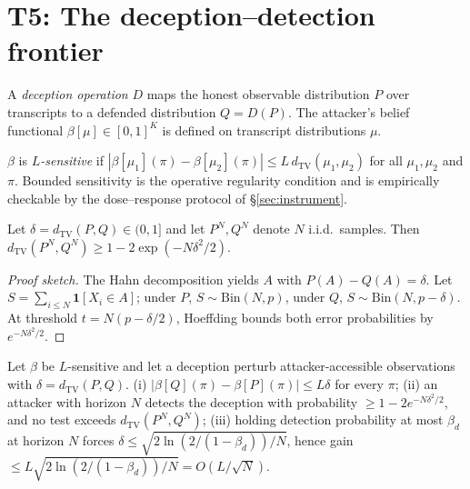 \documentclass[acmsmall,review,anonymous]{acmart}
\newcommand{\TV}{d_{\mathrm{TV}}}
\begin{document}
\section{T5: The deception--detection frontier}\label{sec:t5}

A \emph{deception operation} $D$ maps the honest observable distribution $P$
over transcripts to a defended distribution $Q=D(P)$. The attacker's belief
functional $\beta[\mu]\in[0,1]^K$ is defined on transcript distributions $\mu$.

\begin{definition}[Sensitivity]
$\beta$ is \emph{$L$-sensitive} if
$|\beta[\mu_1](\pi)-\beta[\mu_2](\pi)|\le L\,\TV(\mu_1,\mu_2)$ for all
$\mu_1,\mu_2$ and $\pi$. Bounded sensitivity is the operative regularity
condition and is empirically checkable by the dose--response protocol of
\S\ref{sec:instrument}.
\end{definition}

\begin{lemma}[Amplification]
Let $\delta=\TV(P,Q)\in(0,1]$ and let $P^N,Q^N$ denote $N$ i.i.d.\ samples. Then
$\TV(P^N,Q^N)\ge1-2\exp(-N\delta^2/2)$.
\end{lemma}
\begin{proof}[Proof sketch]
The Hahn decomposition yields $A$ with $P(A)-Q(A)=\delta$. Let
$S=\sum_{i\le N}\mathbf{1}[X_i\in A]$; under $P$, $S\sim\mathrm{Bin}(N,p)$, under
$Q$, $S\sim\mathrm{Bin}(N,p-\delta)$. At threshold $t=N(p-\delta/2)$, Hoeffding
bounds both error probabilities by $e^{-N\delta^2/2}$.
\end{proof}

\begin{theorem}
Let $\beta$ be $L$-sensitive and let a deception perturb attacker-accessible
observations with $\delta=\TV(P,Q)$.
(i) $|\beta[Q](\pi)-\beta[P](\pi)|\le L\delta$ for every $\pi$;
(ii) an attacker with horizon $N$ detects the deception with probability
$\ge1-2e^{-N\delta^2/2}$, and no test exceeds $\TV(P^N,Q^N)$;
(iii) holding detection probability at most $\beta_d$ at horizon $N$ forces
$\delta\le\sqrt{2\ln(2/(1-\beta_d))/N}$, hence gain
$\le L\sqrt{2\ln(2/(1-\beta_d))/N}=O(L/\sqrt N)$.
\end{theorem}
\end{document}
